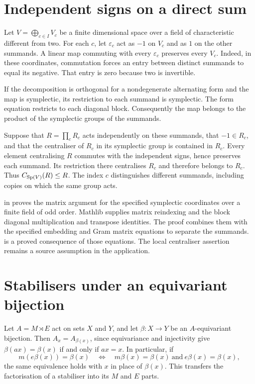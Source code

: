 \section{Independent signs on a direct sum}

Let $V=\bigoplus_{c\in I}V_c$ be a finite dimensional space over a field of
characteristic different from two. For each $c$, let $\varepsilon_c$ act
as $-1$ on $V_c$ and as $1$ on the other summands. A linear map commuting
with every $\varepsilon_c$ preserves every $V_c$. Indeed, in these
coordinates, commutation forces an entry between distinct summands to
equal its negative. That entry is zero because two is invertible.

If the decomposition is orthogonal for a nondegenerate alternating form
and the map is symplectic, its restriction to each summand is symplectic.
The form equation restricts to each diagonal block. Consequently the map
belongs to the product of the symplectic groups of the summands.

Suppose that $R=\prod_c R_c$ acts independently on these summands, that
$-1\in R_c$, and that the centraliser of $R_c$ in its symplectic group
is contained in $R_c$. Every element centralising $R$ commutes with the
independent signs, hence preserves each summand. Its restriction there
centralises $R_c$ and therefore belongs to $R_c$. Thus $C_{\operatorname{Sp}(V)}(R)\leq R$.
The index $c$ distinguishes different summands, including copies on which
the same group acts.

\begin{implementation}
 in
 proves the matrix argument
for the specified symplectic coordinates over a finite field of odd order.
Mathlib supplies matrix reindexing and the block diagonal multiplication
and transpose identities. The proof combines them with the specified
embedding and Gram matrix equations to separate the summands.
 is a proved consequence
of those equations. The local centraliser assertion remains a source
assumption in the application.
\end{implementation}

\section{Stabilisers under an equivariant bijection}

Let $A=M\rtimes E$ act on sets $X$ and $Y$, and let
$\beta:X\longrightarrow Y$ be an $A$-equivariant bijection. Then
$A_x=A_{\beta(x)}$, since equivariance and injectivity give
$\beta(ax)=\beta(x)$ if and only if $ax=x$. In particular, if
\[
 m(e\beta(x))=\beta(x)
 \quad\Longleftrightarrow\quad
 m\beta(x)=\beta(x)\ \text{and}\ e\beta(x)=\beta(x),
\]
the same equivalence holds with $x$ in place of $\beta(x)$. This transfers
the factorisation of a stabiliser into its $M$ and $E$ parts.

